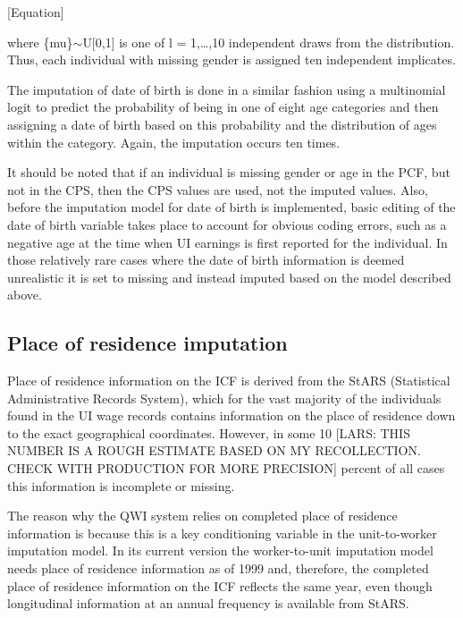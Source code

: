 [Equation]





\noindent
where {\{}mu{\}}$\sim $U[0,1] is one of l = 1,\ldots ,10 independent draws from the distribution. Thus, each individual with missing gender is assigned ten independent implicates.





The imputation of date of birth is done in a similar fashion using a multinomial logit to predict the probability of being in one of eight age categories and then assigning a date of birth based on this probability and the distribution of ages within the category. Again, the imputation occurs ten times.





It should be noted that if an individual is missing gender or age in the PCF, but not in the CPS, then the CPS values are used, not the imputed values. Also, before the imputation model for date of birth is implemented, basic editing of the date of birth variable takes place to account for obvious coding errors, such as a negative age at the time when UI earnings is first reported for the individual. In those relatively rare cases where the date of birth information is deemed unrealistic it is set to missing and instead imputed based on the model described above. 





\subsection{Place of residence imputation}





Place of residence information on the ICF is derived from the StARS (Statistical Administrative Records System), which for the vast majority of the individuals found in the UI wage records contains information on the place of residence down to the exact geographical coordinates. However, in some 10 [LARS: THIS NUMBER IS A ROUGH ESTIMATE BASED ON MY RECOLLECTION. CHECK WITH PRODUCTION FOR MORE PRECISION] percent of all cases this information is incomplete or missing. 





The reason why the QWI system relies on completed place of residence information is because this is a key conditioning variable in the unit-to-worker imputation model. In its current version the worker-to-unit imputation model needs place of residence information as of 1999 and, therefore, the completed place of residence information on the ICF reflects the same year, even though longitudinal information at an annual frequency is available from StARS. 





